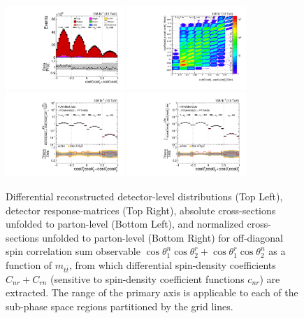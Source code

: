 \clearpage
\begin{figure}[htb]
\begin{center}
 \includegraphics[width=0.40\textwidth]{fig_fullRun2UL/controlplots/combined/Hyp_LLBarCPnr_vs_TTBarMass.pdf}
 \includegraphics[width=0.40\textwidth]{fig_fullRun2UL/unfolding/combined/ResponseMatrix_c_Pnr_mttbar.pdf} \\
 \includegraphics[width=0.40\textwidth]{fig_fullRun2UL/unfolding/combined/UnfoldedResults_c_Pnr_mttbar.pdf}
 \includegraphics[width=0.40\textwidth]{fig_fullRun2UL/unfolding/combined/UnfoldedResultsNorm_c_Pnr_mttbar.pdf} \\
\label{fig:c_Pnr_mttbar}
\caption{Differential reconstructed detector-level distributions (Top Left), detector response-matrices (Top Right), absolute cross-sections unfolded to parton-level (Bottom Left), and normalized cross-sections unfolded to parton-level (Bottom Right) for off-diagonal spin correlation sum observable $\cos\theta_{1}^{n}\cos\theta_{2}^{r}+\cos\theta_{1}^{r}\cos\theta_{2}^{n}$ as a function of $m_{t\bar{t}}$, from which differential spin-density coefficients $C_{nr}+C_{rn}$ (sensitive to spin-density coefficient functions $c_{n r}$) are extracted.  The range of the primary axis is applicable to each of the sub-phase space regions partitioned by the grid lines.}
\end{center}
\end{figure}
